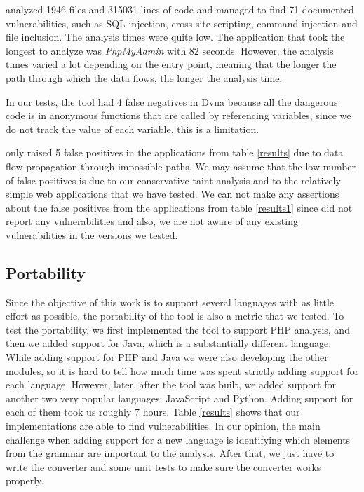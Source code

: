 \toolname{} analyzed 1946 files and 315031 lines of code and managed to find 71 documented vulnerabilities, such as SQL injection, cross-site scripting, command injection and file inclusion. The analysis times were quite low. The application that took the longest to analyze was \textit{PhpMyAdmin} with 82 seconds. However, the analysis times varied a lot depending on the entry point, meaning that the longer the path through which the data flows, the longer the analysis time.

In our tests, the tool had 4 false negatives in Dvna because all the dangerous code is in anonymous functions that are called by referencing variables, since we do not track the value of each variable, this is a limitation. 


\toolname{} only raised 5 false positives in the applications from table \ref{results} due to data flow propagation through impossible paths. We may assume that the low number of false positives is due to our conservative taint analysis and to the relatively simple web applications that we have tested. We can not make any assertions about the false positives from the applications from table \ref{results1} since \toolname{} did not report any vulnerabilities and also, we are not aware of any existing vulnerabilities in the versions we tested.



\subsection{Portability}

Since the objective of this work is to support several languages with as little effort as possible, the portability of the tool is also a metric that we tested. To test the portability, we first implemented the tool to support PHP analysis, and then we added support for Java, which is a substantially different language. While adding support for PHP and Java we were also developing the other modules, so it is hard to tell how much time was spent strictly adding support for each language. However, later, after the tool was built, we added support for another two very popular languages: JavaScript and Python. Adding support for each of them took us roughly 7 hours. Table \ref{results} shows that our implementations are able to find vulnerabilities. In our opinion, the main challenge when adding support for a new language is identifying which elements from the grammar are important to the analysis. After that, we just have to  write the converter and some unit tests to make sure the converter works properly.


